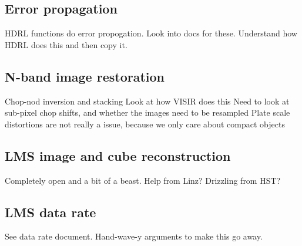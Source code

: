 \subsection{Error propagation}

HDRL functions do error propogation. Look into docs for these. 
Understand how HDRL does this and then copy it.

\subsection{N-band image restoration}

Chop-nod inversion and stacking
Look at how VISIR does this
Need to look at sub-pixel chop shifts, and whether the images need to be resampled
Plate scale distortions are not really a issue, because we only care about compact objects

\subsection{LMS image and cube reconstruction}

Completely open and a bit of a beast. 
Help from Linz?
Drizzling from HST?

\subsection{LMS data rate}

See data rate document. 
Hand-wave-y arguments to make this go away.


